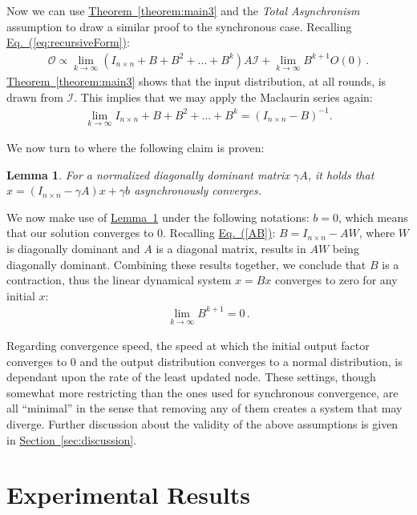 \documentclass[preprint,12pt]{elsarticle}
\newtheorem{lemma}{Lemma}
\newcommand{\namedref}[2]{\hyperref[#2]{#1~\ref*{#2}}}
\newcommand{\sectionref}[1]{\namedref{Section}{#1}}
\newcommand{\theoremref}[1]{\namedref{Theorem}{#1}}
\newcommand{\lemmaref}[1]{\namedref{Lemma}{#1}}
\newcommand{\namedrefeq}[2]{\hyperref[#2]{#1~\mbox{\rm(\ref*{#2})}}}
\newcommand{\equationref}[1]{\namedrefeq{Eq.}{#1}}
\newcommand{\Or}[1]{O(#1)}
\begin{document}
Now we can use \theoremref{theorem:main3} and the {\em Total Asynchronism} assumption to draw a similar proof to the synchronous case. Recalling \equationref{eq:recursiveForm}:
\begin{eqnarray*}
  \mathcal{O} \propto \lim_{k\rightarrow\infty}(I_{n \times n}+B+B^2+\ldots+B^{k}) A \mathcal{I}+\lim_{k\rightarrow\infty}B^{k+1} \Or{0}\,.
\end{eqnarray*}
\theoremref{theorem:main3} shows that the input distribution, at all rounds, is drawn from $\mathcal{I}$. This implies that we may apply the Maclaurin series again:
\begin{eqnarray*}
  \lim_{k\rightarrow\infty}I_{n \times n}+B+B^2+\ldots+B^k = (I_{n \times n}-B)^{-1}.
\end{eqnarray*}

We now turn to  \cite[Section 6.3.2]{BT97} where the following claim is proven:
\begin{lemma}\label{claim:contraction}
  For a normalized diagonally dominant matrix $\gamma A$, it holds that
  $x = (I_{n \times n}-\gamma A)x+\gamma b$ asynchronously converges.
\end{lemma}
We now make use of \lemmaref{claim:contraction} under the following notations: $b=0$, which means that our solution converges to $0$. Recalling \equationref{AB}: $B = I_{n \times n}-AW$, where $W$ is diagonally dominant and $A$ is a diagonal matrix, results in $AW$ being diagonally dominant. Combining these results together, we conclude that $B$ is a contraction, thus the linear dynamical system $x=Bx$ converges to zero for any initial $x$:
\begin{eqnarray*}
  \lim_{k\rightarrow\infty}B^{k+1} = 0\,.
\end{eqnarray*}

Regarding convergence speed, the speed at which the initial output factor converges to $0$ and the output distribution converges to a normal distribution, is dependant upon the rate of the least updated node. These settings, though somewhat more restricting than the ones used for synchronous convergence, are all ``minimal'' in the sense that removing any of them creates a system that may diverge. Further discussion about the validity of the
above assumptions is given in \sectionref{sec:discussion}.

\section{Experimental Results}\label{sec:simlation}
\end{document}

